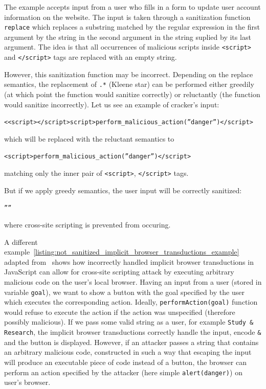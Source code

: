The example accepts input from a user who fills in a form to update user account information on the website.
The input is taken through a sanitization function \texttt{replace} which replaces a substring matched by the regular expression in the first argument by the string in the second argument in the string suplied by its last argument.
The idea is that all occurrences of malicious scripts inside \texttt{<script>} and \texttt{</script>} tags are replaced with an empty string.

However, this sanitization function may be incorrect.
Depending on the replace semantics, the replacement of \texttt{.*} (Kleene star) can be performed either greedily (at which point the function would sanitize correctly) or reluctantly (the function would sanitize incorrectly).
Let us see an example of cracker's input:
\begin{center}
 \texttt{<<script></script>script>perform\_malicious\_action(''danger'')</script>}
\end{center}
which will be replaced with the reluctant semantics to
\begin{center}
 \texttt{<script>perform\_malicious\_action(''danger'')</script>}
\end{center}

matching only the inner pair of \texttt{<script>}, \texttt{</script>} tags.

But if we apply greedy semantics, the user input will be correctly sanitized:
\begin{center}
 \texttt{''''}
\end{center}
where cross-site scripting is prevented from occuring.

A different example~\ref{listing:not_sanitized_implicit_browser_transductions_example} adapted from~\cite{kern14} shows how incorrectly handled implicit browser transductions in JavaScript can allow for cross-site scripting attack by executing arbitrary malicious code on the user's local browser.
Having an input from a user (stored in variable \texttt{goal}), we want to show a button with the goal specified by the user which executes the corresponding action. Ideally, \texttt{performAction(goal)} function would refuse to execute the action if the action was unspecified (therefore possibly malicious).
If we pass some valid string as a user, for example \texttt{Study \& Research}, the implicit browser transductions correctly handle the input, encode \texttt{\&} and the button is displayed.
However, if an attacker passes a string that contains an arbitrary malicious code, constructed in such a way that escaping the input will produce an executable piece of code instead of a button, the browser can perform an action specified by the attacker (here simple \texttt{alert(danger)}) on user's browser.

